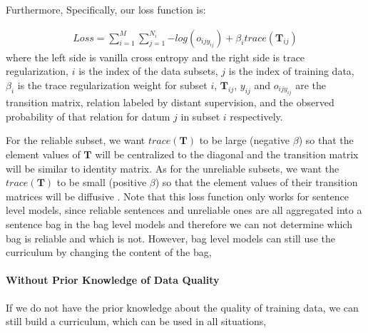 Furthermore, 
Specifically, our loss function is:

\begin{equation}
\begin{aligned}
Loss=\sum_{i=1}^M{\sum_{j=1}^{N_i}{-log(o_{ijy_{ij}})}} + \beta_i trace(\mathbf{T}_{ij})
\end{aligned}
\end{equation}
where the left side is vanilla cross entropy and the right side is trace regularization, $i$ is the index of the data subsets, $j$ is the index of training data, $\beta_i$ is the trace regularization weight for subset $i$, $\mathbf{T}_{ij}$, $y_{ij}$ and $o_{ijy_{ij}}$ are the transition matrix, relation labeled by distant supervision, and the observed probability of that relation for datum $j$ in subset $i$ respectively.

For the reliable subset, we want $trace(\mathbf{T})$ to be large (negative $\beta$) so that the element values of $\mathbf{T}$ will be centralized to the diagonal and the transition matrix will be similar to identity matrix. As for the unreliable subsets, we want the $trace(\mathbf{T})$ to be small (positive $\beta$) so that the element values of their transition matrices will be diffusive . Note that this loss function only works for sentence level models, since reliable sentences and unreliable ones are all aggregated into a sentence bag in the bag level models and therefore we can not determine which bag is reliable and which is not. However, bag level models can still use the curriculum by changing the content of the bag,  

\paragraph{Without Prior Knowledge of Data Quality}
\label{curr_over_data}
If we do not have the prior knowledge about the quality of training data, we can still build a curriculum, which can be used in all situations, 

